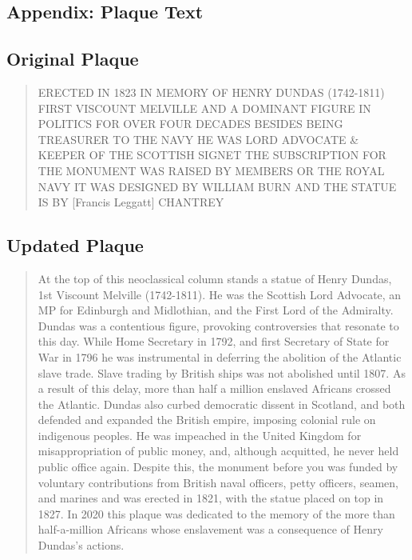 \documentclass{scrartcl}
\begin{document}
\begin{appendices}

\section{Appendix: Plaque Text}\label{sec:plaque-text}

\subsection{Original Plaque}\label{sec:original}

\begin{quotation}
    ERECTED IN 1823 IN MEMORY OF HENRY DUNDAS (1742-1811)
FIRST VISCOUNT MELVILLE AND A DOMINANT FIGURE IN POLITICS FOR OVER FOUR DECADES BESIDES BEING TREASURER TO THE NAVY HE WAS LORD ADVOCATE \& KEEPER OF THE SCOTTISH SIGNET THE SUBSCRIPTION FOR THE MONUMENT WAS RAISED BY MEMBERS OR THE ROYAL NAVY
IT WAS DESIGNED BY WILLIAM BURN AND THE STATUE IS BY [Francis Leggatt] CHANTREY
\end{quotation}

\subsection{Updated Plaque}\label{sec:reworded}

\begin{quotation}
    {At the top of this neoclassical column stands a statue of Henry Dundas, 1st Viscount Melville (1742-1811). He was the Scottish Lord Advocate, an MP for Edinburgh and Midlothian, and the First Lord of the Admiralty. Dundas was a contentious figure, provoking controversies that resonate to this day. While Home Secretary in 1792, and first Secretary of State for War in 1796 he was instrumental in deferring the abolition of the Atlantic slave trade. Slave trading by British ships was not abolished until 1807. As a result of this delay, more than half a million enslaved Africans crossed the Atlantic. Dundas also curbed democratic dissent in Scotland, and both defended and expanded the British empire, imposing colonial rule on indigenous peoples. He was impeached in the United Kingdom for misappropriation of public money, and, although acquitted, he never held public office again. Despite this, the monument before you was funded by voluntary contributions from British naval officers, petty officers, seamen, and marines
and was erected in 1821, with the statue placed on top in 1827. In 2020 this plaque was dedicated to the memory of the more than half-a-million Africans
whose enslavement was a consequence of Henry Dundas's actions.}
\end{quotation}


\end{appendices}
\end{document}

